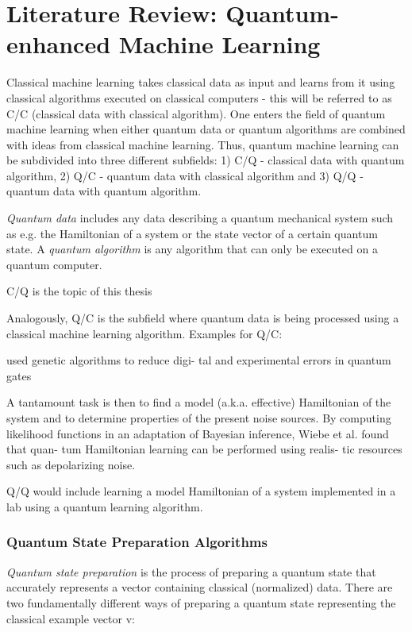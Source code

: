 \chapter{Literature Review: Quantum-enhanced Machine Learning}\label{sec:qml}

Classical machine learning takes classical data as input and learns from it using classical algorithms executed on classical computers - this will be referred to as C/C (classical data with classical algorithm). One enters the field of quantum machine learning when either quantum data or quantum algorithms are combined with ideas from classical machine learning. Thus, quantum machine learning can be subdivided into three different subfields: 1) C/Q - classical data with quantum algorithm, 2) Q/C - quantum data with classical algorithm and 3) Q/Q - quantum data with quantum algorithm.

\emph{Quantum data} includes any data describing a quantum mechanical system such as e.g. the Hamiltonian of a system or the state vector of a certain quantum state. A \emph{quantum algorithm} is any algorithm that can only be executed on a quantum computer. 

C/Q is the topic of this thesis

Analogously, Q/C is the subfield where quantum data is being processed using a classical machine learning algorithm. Examples for Q/C:

used genetic algorithms to reduce digi-
tal and experimental errors in quantum gates

A tantamount task is then to
find a model (a.k.a. effective) Hamiltonian of the system
and to determine properties of the present noise sources.
By computing likelihood functions in an adaptation of
Bayesian inference, Wiebe et al. found that quan-
tum Hamiltonian learning can be performed using realis-
tic resources such as depolarizing noise.

Q/Q would include learning a model Hamiltonian of a system implemented in a lab using a quantum learning algorithm.

\subsection{Quantum State Preparation Algorithms}
\label{subsubsec:quantumstatepreparation}

\emph{Quantum state preparation} is the process of preparing a quantum state that accurately represents a vector containing classical (normalized) data. There are two fundamentally different ways of preparing a quantum state representing the classical example vector v:

